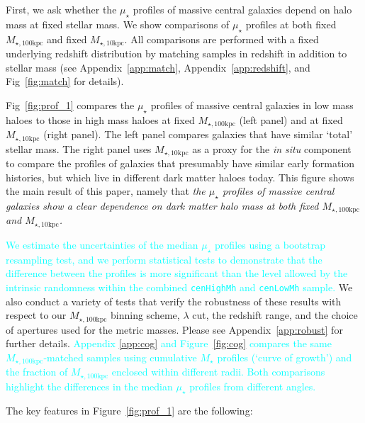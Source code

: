 \documentclass[a4paper,fleqn,usenatbib]{mnras}
\def\rbcg{\texttt{cenHighMh}}
\def\nbcg{\texttt{cenLowMh}}
\def\mstar{{$M_{\star}$}}
\def\minn{{$M_{\star,10\mathrm{kpc}}$}}
\def\mtot{{$M_{\star,100\mathrm{kpc}}$}}
\def\mden{{$\mu_{\star}$}}
\newcommand{\song}[1]{\textcolor{cyan}{#1}}
\begin{document}
    First, we ask whether the \mden{} profiles of massive central galaxies depend on 
    halo mass at fixed stellar mass.    
    We show comparisons of \mden{} profiles at both fixed \mtot{} and fixed 
    \minn{}. All comparisons are performed with a fixed underlying redshift
    distribution by matching samples in redshift in addition to stellar mass
    (see Appendix~\ref{app:match}, Appendix~\ref{app:redshift}, 
    and Fig~\ref{fig:match} for details). 
   
    Fig~\ref{fig:prof_1} compares the \mden{} profiles of massive central galaxies in low mass haloes to those in high mass haloes at fixed \mtot{} (left panel) and at fixed \minn{} (right panel). The left panel compares galaxies that have similar `total' stellar mass. The right panel uses \minn{} as a proxy for the \textit{in situ} component to 
    compare the profiles of galaxies that presumably have similar early formation histories, but which live in different dark matter haloes today. This figure shows the main result of this paper, namely that 
    \emph{the \mden{} profiles of massive central galaxies show a clear dependence on 
    dark matter halo mass at both fixed \mtot{} and \minn{}.}

    \song{
    We estimate the uncertainties of the median \mden{} profiles using a bootstrap 
    resampling test, and we perform statistical tests to demonstrate that the 
    difference between the profiles is more significant than the level allowed by 
    the intrinsic randomness within the combined \rbcg{} and \nbcg{} sample. 
    }
    We also conduct a variety of tests that verify the robustness of these results with
    respect to our \mtot{} binning scheme, $\lambda$ cut, the redshift range, and the 
    choice of apertures used for the metric masses. 
    Please see Appendix~\ref{app:robust} for further details.
    \song{Appendix \ref{app:cog} and Figure~\ref{fig:cog} compares the same 
    \mtot{}-matched samples using cumulative \mstar{} profiles (`curve of growth') 
    and the fraction of \mtot{} enclosed within different radii.
    Both comparisons highlight the differences in the median \mden{} profiles 
    from different angles.   
    }
   
    The key features in Figure~\ref{fig:prof_1} are the following:
    
\end{document}
